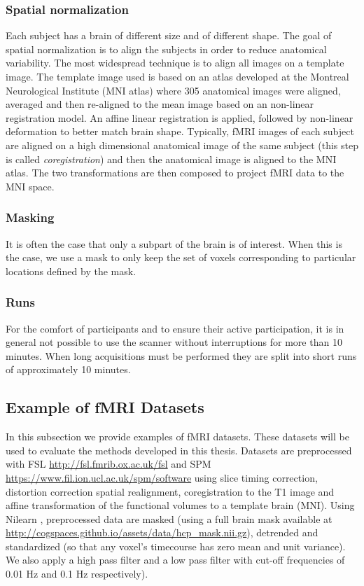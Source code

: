\subsubsection{Spatial normalization}
Each subject has a brain of different size and of different shape.
The goal of spatial normalization is to align the subjects in order to reduce anatomical variability.
The most widespread technique is to align all images on a template image. The
template image used is based on an atlas developed at the Montreal Neurological
Institute (MNI atlas) where 305 anatomical images were aligned, averaged and then re-aligned to the mean image based on an non-linear registration model.
An affine linear registration is applied, followed by non-linear deformation to better match brain shape. Typically, fMRI images of each subject are aligned on a high dimensional anatomical image of the same subject (this step is called \emph{coregistration}) and then the anatomical image is aligned to the MNI atlas. The two transformations are then composed to project fMRI data to the MNI space.

\subsubsection{Masking}
It is often the case that only a subpart of the brain is of interest. When this is the case, we use a mask to only keep the set of voxels corresponding to particular locations defined by the mask.

\subsubsection{Runs}
For the comfort of participants and to ensure their active participation, it is in general not possible to use the scanner without interruptions for more than 10 minutes.  When long acquisitions must be
performed they are split into short runs of approximately 10 minutes.


\subsection{Example of fMRI Datasets}
\label{srm:datasets:fmri}
In this subsection we provide examples of fMRI datasets. These datasets will be used to evaluate the methods developed in this thesis.
Datasets are preprocessed with FSL \url{http://fsl.fmrib.ox.ac.uk/fsl}  and SPM \url{https://www.fil.ion.ucl.ac.uk/spm/software} using slice timing correction, distortion correction spatial realignment, coregistration to the T1 image and affine transformation of the functional volumes to a template brain (MNI).
Using Nilearn \cite{abraham2014machine}, preprocessed data are masked (using a full brain mask available at
\url{http://cogspaces.github.io/assets/data/hcp_mask.nii.gz}), detrended and
standardized (so that any voxel's timecourse has zero mean and unit variance).
We also apply a high pass filter and a low pass filter with cut-off frequencies of 0.01 Hz and 0.1 Hz respectively).

